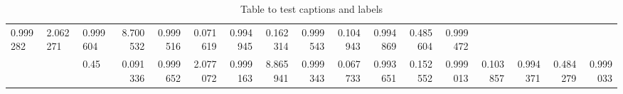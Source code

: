 \begin{table}[h!]
{\begin{adjustwidth}{-3cm}{0cm}
{\begin{tabular}{l|l|l|r|r|r|r|r|r|r|r|r|r|r|r|r|r|}
0.999282 &  2.062271 &  0.999604 &  8.700532 &  0.999516 &  0.071619 &  0.994945 &  0.162314 &  0.999543 &  0.104943 &  0.994869 &  0.485604 &  0.999472 \\    &   & 0.45 &  0.091336 &  0.999652 &  2.077072 &  0.999163 &  8.865941 &  0.999343 &  0.067733 &  0.993651 &  0.152552 &  0.999013 &  0.103857 &  0.994371 &  0.484279 &  0.999033 
        \\
        \hline
        \end{tabular}
        }
        
        \end{adjustwidth}
        }


    \caption{Table to test captions and labels}
    \label{table1}
    \end{table}
